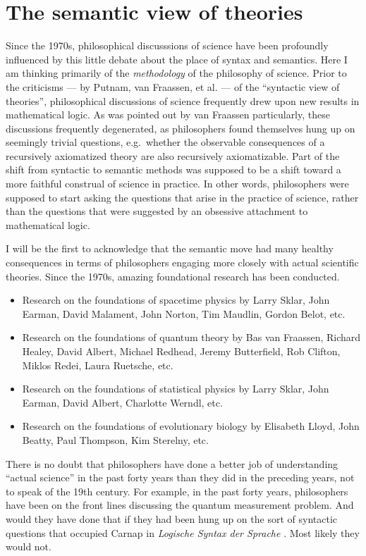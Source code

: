 \section{The semantic view of theories}

Since the 1970s, philosophical discusssions of science have been
profoundly influenced by this little debate about the place of syntax
and semantics.  Here I am thinking primarily of the {\it methodology}
of the philosophy of science.  Prior to the criticisms --- by Putnam,
van Fraassen, et al. --- of the ``syntactic view of theories'',
philosophical discussions of science frequently drew upon new results
in mathematical logic.  As was pointed out by van Fraassen
particularly, these discussions frequently degenerated, as
philosophers found themselves hung up on seemingly trivial questions,
e.g.\ whether the observable consequences of a recursively axiomatized
theory are also recursively axiomatizable.  Part of the shift from
syntactic to semantic methods was supposed to be a shift toward a more
faithful construal of science in practice.  In other words,
philosophers were supposed to start asking the questions that arise in
the practice of science, rather than the questions that were suggested
by an obsessive attachment to mathematical logic.

I will be the first to acknowledge that the semantic move had many
healthy consequences in terms of philosophers engaging more closely
with actual scientific theories.  Since the 1970s, amazing
foundational research has been conducted.
\begin{itemize}
\item Research on the foundations of spacetime physics by Larry Sklar,
  John Earman, David Malament, John Norton, Tim Maudlin, Gordon Belot,
  etc.
\item Research on the foundations of quantum theory by Bas van
  Fraassen, Richard Healey, David Albert, Michael Redhead, Jeremy
  Butterfield, Rob Clifton, Miklos Redei, Laura Ruetsche, etc.
\item Research on the foundations of statistical physics by Larry
  Sklar, John Earman, David Albert, Charlotte Werndl, etc.
\item Research on the foundations of evolutionary biology by Elisabeth
  Lloyd, John Beatty, Paul Thompson, Kim Sterelny, etc.
\end{itemize}
There is no doubt that philosophers have done a better job of
understanding ``actual science'' in the past forty years than they did
in the preceding years, not to speak of the 19th century.  For
example, in the past forty years, philosophers have been on the front
lines discussing the quantum measurement problem.  And would they have
done that if they had been hung up on the sort of syntactic questions
that occupied Carnap in {\it Logische Syntax der Sprache}
\citeyearpar{carnap1934}.  Most likely they would not.


